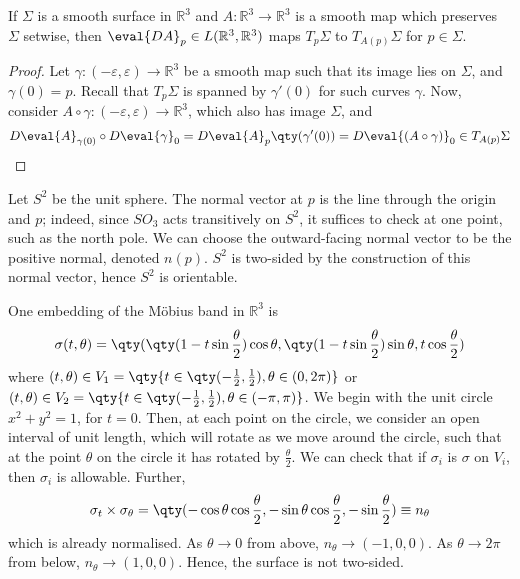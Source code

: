 \begin{lemma}
	If $\Sigma$ is a smooth surface in $\mathbb R^3$ and $A \colon \mathbb R^3 \to \mathbb R^3$ is a smooth map which preserves $\Sigma$ setwise, then $\eval{DA}_p \in L(\mathbb R^3, \mathbb R^3)$ maps $T_p \Sigma$ to $T_{A(p)} \Sigma$ for $p \in \Sigma$.
\end{lemma}

\begin{proof}
	Let $\gamma \colon (-\varepsilon, \varepsilon) \to \mathbb R^3$ be a smooth map such that its image lies on $\Sigma$, and $\gamma(0) = p$.
	Recall that $T_p \Sigma$ is spanned by $\gamma'(0)$ for such curves $\gamma$.
	Now, consider $A \circ \gamma \colon (-\varepsilon, \varepsilon) \to \mathbb R^3$, which also has image $\Sigma$, and
	\begin{align*}
		D \eval{A}_{\gamma(0)} \circ D \eval{\gamma}_0 = D \eval{A}_p \qty(\gamma'(0)) = D \eval{(A \circ \gamma)}_0 \in T_{A(p)} \Sigma
	\end{align*}
\end{proof}

\begin{example}
	Let $S^2$ be the unit sphere.
	The normal vector at $p$ is the line through the origin and $p$; indeed, since $SO_3$ acts transitively on $S^2$, it suffices to check at one point, such as the north pole.
	We can choose the outward-facing normal vector to be the positive normal, denoted $n(p)$.
	$S^2$ is two-sided by the construction of this normal vector, hence $S^2$ is orientable.
\end{example}
\begin{example}
	One embedding of the M\"obius band in $\mathbb R^3$ is
	\begin{align*}
		\sigma(t,\theta) = \qty(\qty(1 - t \sin \frac{\theta}{2})\cos \theta, \qty(1 - t \sin \frac{\theta}{2})\sin \theta, t \cos \frac{\theta}{2})
	\end{align*}
	where $(t,\theta) \in V_1 = \qty{t \in \qty(-\frac{1}{2}, \frac{1}{2}), \theta \in (0,2\pi)}$ or $(t,\theta) \in V_2 = \qty{t \in \qty(-\frac{1}{2}, \frac{1}{2}), \theta \in (-\pi, \pi)}$.
	We begin with the unit circle $x^2 + y^2 = 1$, for $t = 0$.
	Then, at each point on the circle, we consider an open interval of unit length, which will rotate as we move around the circle, such that at the point $\theta$ on the circle it has rotated by $\frac{\theta}{2}$.
	We can check that if $\sigma_i$ is $\sigma$ on $V_i$, then $\sigma_i$ is allowable.
	Further,
	\begin{align*}
		\sigma_t \times \sigma_\theta = \qty(-\cos\theta \cos\frac{\theta}{2}, -\sin\theta \cos\frac{\theta}{2}, -\sin\frac{\theta}{2}) \equiv n_\theta
	\end{align*}
	which is already normalised.
	As $\theta \to 0$ from above, $n_\theta \to (-1,0,0)$.
	As $\theta \to 2\pi$ from below, $n_\theta \to (1,0,0)$.
	Hence, the surface is not two-sided.
\end{example}
